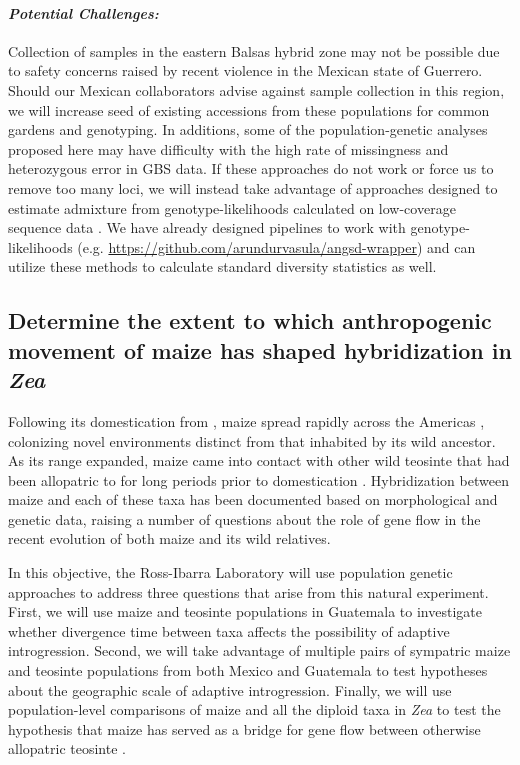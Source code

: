 \paragraph{\emph{Potential Challenges:}}
Collection of samples in the eastern Balsas hybrid zone may not be possible due to safety concerns raised by recent violence in the Mexican state of Guerrero.
Should our Mexican collaborators advise against sample collection in this region, we will increase seed of existing accessions from these populations for common gardens and genotyping.
In additions, some of the population-genetic analyses proposed here may have difficulty with the high rate of missingness and heterozygous error in GBS data.
If these approaches do not work or force us to remove too many loci, we will instead take advantage of approaches designed  to estimate admixture from genotype-likelihoods calculated on low-coverage sequence data \citep{skotte2013estimating}. 
We have already designed pipelines to work with genotype-likelihoods (e.g. \url{https://github.com/arundurvasula/angsd-wrapper}) and can utilize these methods to calculate standard diversity statistics as well.  

\subsection{Determine the extent to which anthropogenic movement of maize has shaped hybridization in \emph{Zea} } 
\label{ss:genuswide}
Following its domestication from \zp{}, maize spread rapidly across the Americas \citep{Piperno2001,Grobman2012}, colonizing novel environments distinct from that inhabited by its wild ancestor. 
As its range expanded, maize came into contact with other wild teosinte that had been allopatric to \zp{} for long periods prior to domestication \citep{hufford2012inferences}.  
Hybridization between maize and each of these taxa has been documented based on morphological \citep{wilkes1967teosinte, Wilkes1977} and genetic \citep{doebley1990molecular,Fukunaga2005,Ross-Ibarra2009a,vanheerwaarden2011a} data, raising a number of questions about the role of gene flow in the recent evolution of both maize and its wild relatives.

In this objective, the Ross-Ibarra Laboratory will use population genetic approaches to address three questions that arise from this natural experiment.  
First, we will use maize and teosinte populations in Guatemala to investigate whether divergence time between taxa affects the possibility of adaptive introgression. 
Second, we will take advantage of multiple pairs of sympatric maize and teosinte populations from both Mexico and Guatemala to test hypotheses about the geographic scale of adaptive introgression.
Finally, we will use population-level comparisons of maize and all the diploid taxa in \emph{Zea} to test the hypothesis that maize has served as a bridge for gene flow between otherwise allopatric teosinte \citep{Ross-Ibarra2009a}.



